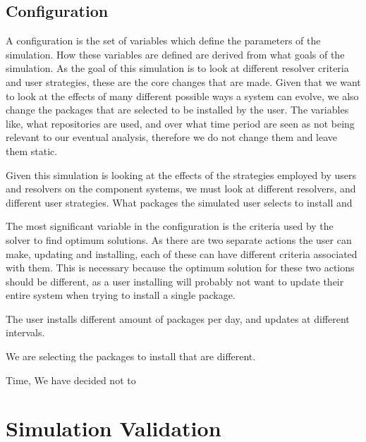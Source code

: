 
\subsection{Configuration}
A configuration is the set of variables which define the parameters of the simulation.
How these variables are defined are derived from what goals of the simulation.
As the goal of this simulation is to look at different resolver criteria and user strategies,
these are the core changes that are made.
Given that we want to look at the effects of many different possible ways a system can evolve,
we also change the packages that are selected to be installed by the user.
The variables like, what repositories are used, and over what time period are seen as not being relevant to our eventual analysis,
therefore we do not change them and leave them static.

Given this simulation is looking at the effects of the strategies employed by users and resolvers on the component systems,
we must look at different resolvers, and different user strategies.
What packages the simulated user selects to install and 

The most significant variable in the configuration is the criteria used by the solver to find optimum solutions. 
As there are two separate actions the user can make, updating and installing, each of these can have different criteria associated with them.
This is necessary because the optimum solution for these two actions should be different,
as a user installing will probably not want to update their entire system when trying to install a single package.

The user installs different amount of packages per day, and updates at different intervals. 

We are selecting the packages to install that are different.

Time, We have decided not to 





\section{Simulation Validation}


